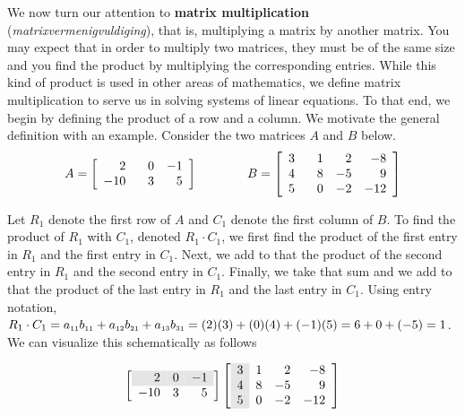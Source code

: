 \smallskip

We now turn our attention to \textbf{matrix multiplication} (\textit{matrixvermenigvuldiging}), that is, multiplying a matrix by another matrix.  You may expect that in order to multiply two matrices, they must be of the same size and you find the product by multiplying the corresponding entries.  While this kind of product is used in other areas of mathematics, we define matrix multiplication to serve us in solving systems of linear equations.  To that end, we begin by defining the product of a row and a column.  We motivate the general definition with an example.  Consider the two matrices $A$ and $B$ below.
\[ A = \left[\begin{array}{rrr} 2 & \hphantom{-}0 & -1 \\ -10 & 3 & 5 \\ \end{array} \right] \qquad \qquad B = \left[\begin{array}{rrrr} 3 & \hphantom{-}1 & 2 & -8 \\ 4 & 8 & -5 & 9  \\ 5 & 0 & -2 & -12 \\  \end{array} \right]\]

Let $R_1$ denote the first row of $A$ and $C_1$ denote the first column of $B$.  To find the product of $R_1$ with $C_1$, denoted $R_1 \cdot C_1$, we first find the product of the first entry in $R_1$ and the first entry in $C_1$.  Next, we add to that the product of the second entry in $R_1$ and the second entry in $C_1$.  Finally, we take that sum and we add to that the product of the last entry in $R_1$ and the last entry in $C_1$.  Using entry notation, $R_1 \cdot C_1 = a_{\mbox{\tiny$11$}}b_{\mbox{\tiny$11$}} + a_{\mbox{\tiny$12$}}b_{\mbox{\tiny$21$}}+a_{\mbox{\tiny$13$}}b_{\mbox{\tiny$31$}} = (2)(3) + (0)(4) + (-1)(5) = 6 + 0 + (-5) = 1$.  We can visualize this schematically as follows

\[ \left[\begin{array}{rrr} \rowcolor[gray]{0.9} 2 &  0 & -1 \\ -10 & 3 & 5 \\ \end{array} \right] \left[\begin{array}{>{\columncolor[gray]{0.9}}rrrr}  3 & 1 & 2 & -8 \\ 4 & 8 & -5 & 9  \\ 5 & 0 & -2 & -12 \\  \end{array} \right] \]


